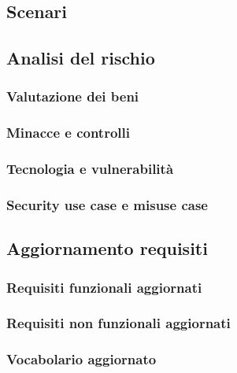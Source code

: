\documentclass{article}
\begin{document}
\subsection{Scenari}


\subsection{Analisi del rischio}
\subsubsection{Valutazione dei beni}

\subsubsection{Minacce e controlli}

\subsubsection{Tecnologia e vulnerabilità}

\subsubsection{Security use case e misuse case}


\subsection{Aggiornamento requisiti}
\subsubsection{Requisiti funzionali aggiornati}

\subsubsection{Requisiti non funzionali aggiornati}

\subsubsection{Vocabolario aggiornato}

\end{document}
